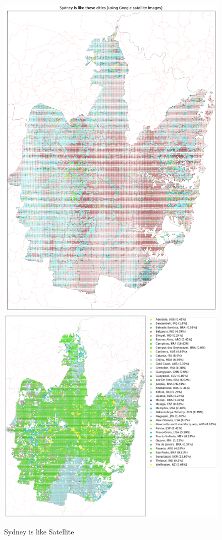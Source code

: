 \documentclass[sageh,times]{sagej}
\begin{document}
\begin{figure}[!htbp]
\centering    
\includegraphics[scale=0.25]{Images/SydneyOverall_sat.png} 
\includegraphics[scale=0.25]{Images/SydneyOverallAbrev_sat.png} 
\caption{Sydney is like Satellite}    
 \label{fig:sydmaps}  
\end{figure} 
\end{document}
